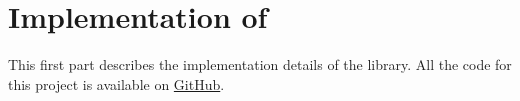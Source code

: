 \part{Implementation of \mfnet}

This first part describes the implementation details of the \mfnet library. All the code for this project is available on \href{https://www.github.com/marchfra/mfnet}{GitHub}.



\newpage


\newpage



